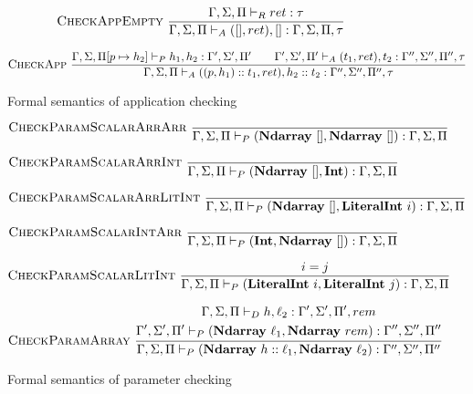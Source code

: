 \documentclass{report}
\begin{document}
\begin{figure}
    $$\textsc{CheckAppEmpty}~\frac{\Gamma, \Sigma, \Pi \vdash_R ret : \tau}{\Gamma, \Sigma, \Pi \vdash_A ([], ret), [] : \Gamma, \Sigma, \Pi, \tau}$$

    $$\textsc{CheckApp}~\frac{\Gamma, \Sigma, \Pi[p \mapsto h_2] \vdash_P h_1, h_2 : \Gamma', \Sigma', \Pi' \qquad \Gamma', \Sigma', \Pi' \vdash_A (t_1, ret), t_2 : \Gamma'', \Sigma'', \Pi'', \tau}{\Gamma, \Sigma, \Pi \vdash_A ((p, h_1) :: t_1, ret), h_2 :: t_2 : \Gamma'', \Sigma'', \Pi'', \tau}$$
    \caption{Formal semantics of application checking}
    \label{semantics:app}
\end{figure}

\begin{figure}
    $$\textsc{CheckParamScalarArrArr}~\frac{}{\Gamma, \Sigma, \Pi \vdash_P (\textbf{Ndarray}~[], \textbf{Ndarray}~[]) : \Gamma, \Sigma, \Pi}$$

    $$\textsc{CheckParamScalarArrInt}~\frac{}{\Gamma, \Sigma, \Pi \vdash_P (\textbf{Ndarray}~[], \textbf{Int}) : \Gamma, \Sigma, \Pi}$$

    $$\textsc{CheckParamScalarArrLitInt}~\frac{}{\Gamma, \Sigma, \Pi \vdash_P (\textbf{Ndarray}~[], \textbf{LiteralInt}~i) : \Gamma, \Sigma, \Pi}$$

    $$\textsc{CheckParamScalarIntArr}~\frac{}{\Gamma, \Sigma, \Pi \vdash_P (\textbf{Int}, \textbf{Ndarray}~[]) : \Gamma, \Sigma, \Pi}$$

    $$\textsc{CheckParamScalarLitInt}~\frac{i = j}{\Gamma, \Sigma, \Pi \vdash_P (\textbf{LiteralInt}~i, \textbf{LiteralInt}~j) : \Gamma, \Sigma, \Pi}$$

    $$\textsc{CheckParamArray}~\frac{\begin{gathered}\Gamma, \Sigma, \Pi \vdash_D h, \ell_2 : \Gamma', \Sigma', \Pi', rem \\ \Gamma', \Sigma', \Pi' \vdash_P (\textbf{Ndarray}~\ell_1, \textbf{Ndarray}~rem) : \Gamma'', \Sigma'', \Pi''\end{gathered}}{\Gamma, \Sigma, \Pi \vdash_P (\textbf{Ndarray}~h :: \ell_1, \textbf{Ndarray}~\ell_2) : \Gamma'', \Sigma'', \Pi''}$$
    \caption{Formal semantics of parameter checking}
    \label{semantics:param}
\end{figure}
\end{document}
